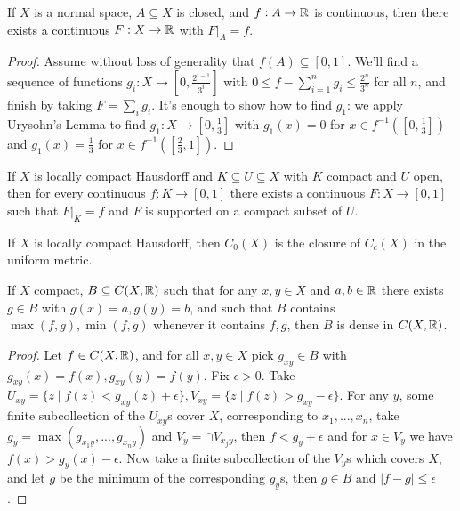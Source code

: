\begin{thm}\label{tietze} If $X$ is a normal space, $A \subseteq X$ is closed, and $f : A \rightarrow \mathbb{R}$ is continuous, then there exists a continuous $F : X \rightarrow \mathbb{R}$ with $F|_A = f$.
\end{thm}
\begin{proof} Assume without loss of generality that $f(A) \subseteq [0,1]$. We'll find a sequence of functions $g_i: X \rightarrow [0, \frac{2^{i-1}}{3^i}]$ with $0 \le f - \sum_{i=1}^n g_i \le \frac{2^n}{3^n}$ for all $n$, and finish by taking $F = \sum_i g_i$. It's enough to show how to find $g_1$: we apply Urysohn's Lemma to find $g_1 : X \rightarrow [0,\frac{1}{3}]$ with $g_1(x) = 0$ for $x \in f^{-1}([0,\frac{1}{3}])$ and $g_1(x) = \frac{1}{3}$ for $x \in f^{-1}([\frac{2}{3},1])$.
\end{proof}

\begin{cor}\label{lch-tietze} If $X$ is locally compact Hausdorff and $K \subseteq U \subseteq X$ with $K$ compact and $U$ open, then for every continuous $f : K \rightarrow [0,1]$ there exists a continuous $F : X \rightarrow [0,1]$ such that $F|_K = f$ and $F$ is supported on a compact subset of $U$.
\end{cor}

\begin{prop} If $X$ is locally compact Hausdorff, then $C_0(X)$ is the closure of $C_c(X)$ in the uniform metric.
\end{prop}

\begin{thm} If $X$ compact, $B \subseteq C(X,\mathbb{R})$ such that for any $x,y \in X$ and $a,b \in \mathbb{R}$ there exists $g \in B$ with $g(x) = a, g(y) = b$, and such that $B$ contains $\max(f,g), \min(f,g)$ whenever it contains $f,g$, then $B$ is dense in $C(X,\mathbb{R})$.
\end{thm}
\begin{proof} Let $f \in C(X,\mathbb{R})$, and for all $x,y \in X$ pick $g_{xy} \in B$ with $g_{xy}(x) = f(x), g_{xy}(y) = f(y)$. Fix $\epsilon > 0$. Take $U_{xy} = \{z \mid f(z) < g_{xy}(z) + \epsilon\}, V_{xy} = \{z \mid f(z) > g_{xy} - \epsilon\}$. For any $y$, some finite subcollection of the $U_{xy}$s cover $X$, corresponding to $x_1, ..., x_n$, take $g_y = \max(g_{x_1y}, ..., g_{x_ny})$ and $V_y = \cap V_{x_jy}$, then $f < g_y + \epsilon$ and for $x \in V_y$ we have $f(x) > g_y(x) - \epsilon$. Now take a finite subcollection of the $V_y$s which covers $X$, and let $g$ be the minimum of the corresponding $g_y$s, then $g \in B$ and $|f-g| \le \epsilon$.
\end{proof}

